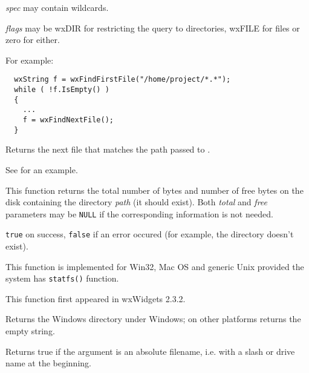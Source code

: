 {\it spec} may contain wildcards.

{\it flags} may be wxDIR for restricting the query to directories, wxFILE for files or zero for either.

For example:

\begin{verbatim}
  wxString f = wxFindFirstFile("/home/project/*.*");
  while ( !f.IsEmpty() )
  {
    ...
    f = wxFindNextFile();
  }
\end{verbatim}


\label{wxfindnextfile}


Returns the next file that matches the path passed to .

See  for an example.


\label{wxgetdiskspace}


This function returns the total number of bytes and number of free bytes on
the disk containing the directory {\it path} (it should exist). Both
{\it total} and {\it free} parameters may be {\tt NULL} if the corresponding
information is not needed.


{\tt true} on success, {\tt false} if an error occured (for example, the
directory doesn't exist).


This function is implemented for Win32,
Mac OS and generic Unix provided the system has {\tt statfs()} function.

This function first appeared in wxWidgets 2.3.2.


\label{wxgetosdirectory}


Returns the Windows directory under Windows; on other platforms returns the empty string.


\label{wxisabsolutepath}


Returns true if the argument is an absolute filename, i.e. with a slash
or drive name at the beginning.


